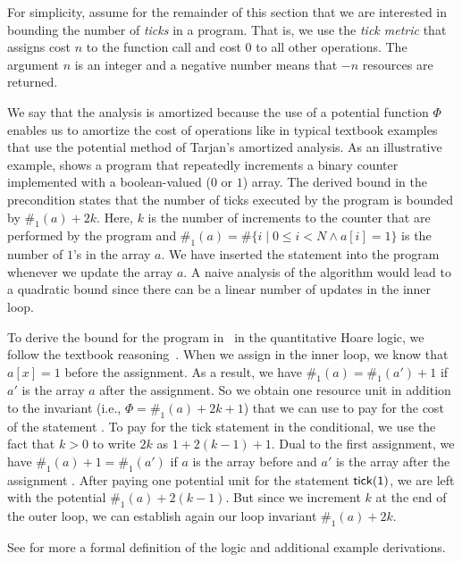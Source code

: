 \documentclass[nocopyrightspace,preprint,pldi]{sigplanconf-pldi15}
\newcommand{\pref}[1]{\prettyref{#1}}
\begin{document}
For simplicity, assume for the remainder of this section that we are
interested in bounding the number of \emph{ticks} in a program.  That
is, we use the \emph{tick metric} that assigns cost $n$ to the function call
 and cost $0$ to all other operations.  The argument $n$
is an integer and a negative number means that $-n$ resources are
returned.

We say that the analysis is amortized because the use of a potential
function $\Phi$ enables us to amortize the cost of operations like in
typical textbook examples that use the potential method of Tarjan's
amortized analysis.  As an illustrative example, \pref{fig:xmplinc}
shows a program that repeatedly increments a binary counter
implemented with a boolean-valued ($0$ or $1$) array.  The derived
bound in the precondition states that the number of ticks
executed by the program is bounded by $\#_1(a) + 2k$.  Here, $k$ is
the number of increments to the counter that are performed by the
program and $ \#_1(a) = \# \{ i \mid 0 \le i < N \land a[i] = 1 \}$ is
the number of $1$'s in the array $a$.  We have inserted the statement
 into the program whenever we update the array $a$.  A
naive analysis of the algorithm would lead to a quadratic bound since
there can be a linear number of updates in the inner loop.

To derive the bound for the program in~\pref{fig:xmplinc} in the
quantitative Hoare logic, we follow the textbook
reasoning~\cite{Algorithms}.  When we assign  in the
inner loop, we know that $a[x]=1$ before the assignment.  As a result,
we have $\#_1(a) = \#_1(a') + 1$ if $a'$ is the array $a$ after the
assignment.  So we obtain one resource unit in addition to the
invariant (i.e., $\Phi = \#_1(a) + 2k + 1$) that we can use to pay for the
cost of the statement .  To pay for the tick statement
in the conditional, we use the fact that $k>0$ to write $2k$ as $1 +
2(k-1) +1$.  Dual to the first assignment, we have $\#_1(a) +1 =
\#_1(a')$ if $a$ is the array before and $a'$ is the array after the
assignment .  After paying one potential unit for the
statement $\mathsf{tick(1)}$, we are left with the potential $\#_1(a) +
2(k - 1)$.  But since we increment $k$ at the end of the outer loop,
we can establish again our loop invariant $\#_1(a) + 2k$.

See \pref{sec:logic} for more a formal definition of the logic and
additional example derivations.
\end{document}
